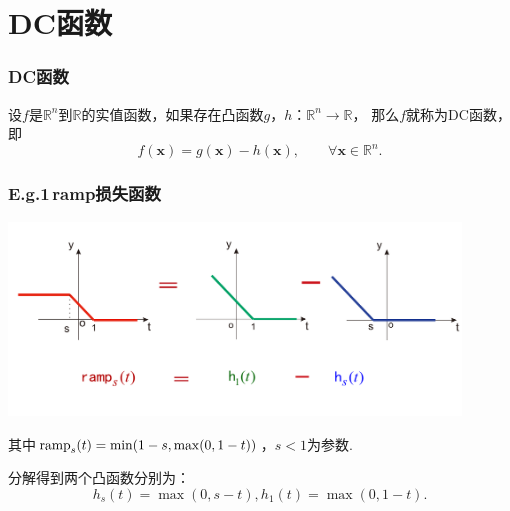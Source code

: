 \documentclass{beamer}
\begin{document}
\section{DC函数}
\begin{frame}
\frametitle{DC函数}
\begin{definition}
设$f$是$\mathbb{R}^{n}$到$\mathbb{R}$的实值函数，如果存在凸函数$g$，$h$：${\mathbb{R}^{n} \rightarrow \mathbb{R}}$，
那么$f$就称为DC函数，即
$$
f(\mathbf{x})=g(\mathbf{x})-h(\mathbf{x}), \qquad \forall \mathbf{x} \in \mathbb{R}^{n}.
$$
\end{definition}

\end{frame}



\begin{frame}%
\frametitle{ E.g.1\,ramp损失函数}


\includegraphics[width=0.9\textwidth]{./figure/ramp}

其中$\textnormal{ramp}_{s}^{} (t) = \min(1-s,\max(0,1-t))$，$s<1$为参数.


分解得到两个凸函数分别为：
$$h_s^{}(t) = \max(0,s-t),h_1{}(t)= \max(0,1-t).$$



\end{frame}
\end{document}
